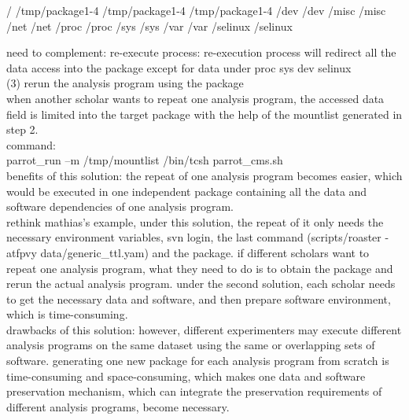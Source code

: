 \documentclass{article}
\begin{document}
/ /tmp/package1-4
/tmp/package1-4 /tmp/package1-4
/dev /dev
/misc /misc
/net /net
/proc /proc
/sys /sys
/var /var
/selinux /selinux


need to complement: re-execute process: re-execution process will redirect all the data access into the package except for data under proc sys dev selinux\\

(3) rerun the analysis program using the package\\
when another scholar wants to repeat one analysis program, the accessed data field is limited into the target package with the help of the mountlist generated in step 2. \\

command:\\
parrot\_run –m /tmp/mountlist /bin/tcsh parrot\_cms.sh\\

benefits of this solution: the repeat of one analysis program becomes easier, which would be executed in one independent package containing all the data and software dependencies of one analysis program. \\

rethink mathias’s example, under this solution, the repeat of it only needs the necessary environment variables, svn login,  the last command (scripts/roaster -atfpvy data/generic\_ttl.yam) and the package. if different scholars want to repeat one analysis program, what they need to do is to obtain the package and rerun the actual analysis program. under the second solution, each scholar needs to get the necessary data and software, and then prepare software environment, which is time-consuming. \\

drawbacks of this solution: however, different experimenters may execute different analysis programs on the same dataset using the same or overlapping sets of software. generating one new package for each analysis program from scratch is time-consuming and space-consuming, which makes one data and software preservation mechanism, which can integrate the preservation requirements of different analysis programs, become necessary. \\
\end{document}

